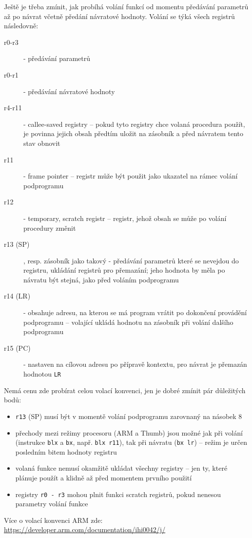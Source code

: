 \documentclass{article}
\begin{document}
Ještě je třeba zmínit, jak probíhá volání funkcí od momentu předávání parametrů až po návrat včetně předání návratové hodnoty. Volání se týká všech registrů následovně:

\begin{description}
	\item[r0-r3] - předávání parametrů
	\item[r0-r1] - předávání návratové hodnoty
	\item[r4-r11] - callee-saved registry -- pokud tyto registry chce volaná procedura použít, je povinna jejich obsah předtím uložit na zásobník a před návratem tento stav obnovit
	\item[r11] - frame pointer -- registr může být použit jako ukazatel na rámec volání podprogramu
	\item[r12] - temporary, scratch registr -- registr, jehož obsah se může po volání procedury změnit
	\item[r13 (SP)], resp. zásobník jako takový - předávání parametrů které se nevejdou do registru, ukládání registrů pro přemazání; jeho hodnota by měla po návratu být stejná, jako před voláním podprogramu
	\item[r14 (LR)] - obsahuje adresu, na kterou se má program vrátit po dokončení provádění podprogramu -- volající ukládá hodnotu na zásobník při volání dalšího podprogramu
	\item[r15 (PC)] - nastaven na cílovou adresu po přípravě kontextu, pro návrat je přemazán hodnotou \texttt{LR}
\end{description}

Nemá cenu zde probírat celou volací konvenci, jen je dobré zmínit pár důležitých bodů:
\begin{itemize}
	\item \texttt{r13} (SP) musí být v momentě volání podprogramu zarovnaný na násobek 8
	\item přechody mezi režimy procesoru (ARM a Thumb) jsou možné jak při volání (instrukce \texttt{blx} a \texttt{bx}, např. \texttt{blx r11}), tak při návratu (\texttt{bx lr}) -- režim je určen posledním bitem hodnoty registru
	\item volaná funkce nemusí okamžitě ukládat všechny registry -- jen ty, které plánuje použít a klidně až před momentem prvního použití
	\item registry \texttt{r0 - r3} mohou plnit funkci scratch registrů, pokud nenesou parametry volání funkce
\end{itemize}

Více o volací konvenci ARM zde: \url{https://developer.arm.com/documentation/ihi0042/j/}
\end{document}
